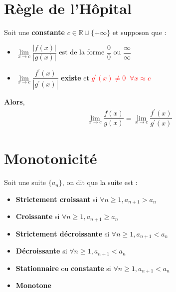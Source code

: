 \documentclass{report}
\begin{document}
\begin{multicols*}{3}
    \section{Règle de l'Hôpital}
        Soit une \textbf{constante} $c \in \mathbb{R} \cup \{+\infty\}$ et supposon que : 
        \begin{itemize}
        \item $\lim\limits_{x\to c}\dfrac{|f(x)|}{|g(x)|}$ 
            est de la forme $\dfrac{0}{0}$ ou 
            $\dfrac{\infty }{\infty }$
        \item $\lim\limits_{x\to c}\dfrac{f^{\prime}(x)}{|g^{\prime}(x)|}$
            \textbf{existe} et 
            \textcolor{red}{$g^{\prime}(x) \neq 0 \;\; \forall x \approx c$ }
        \end{itemize}
        \textbf{Alors}, 
        \begin{align*}
            \lim\limits_{x\to c}\dfrac{f(x)}{g(x)} = 
            \lim\limits_{x\to c}\dfrac{f^{\prime}(x)}{g^{\prime}(x)}
        \end{align*}
        


    \section{Monotonicité} 
        Soit une suite $\{a_n \}$, on dit que la suite est :
        \begin{itemize}
            \item \textbf{Strictement croissant} si $\forall n \geq 1, 
                a_{n+1} > a_n$
            \item \textbf{Croissante} si $\forall n \geq 1, 
                a_{n+1} \geq a_n$ 
            \item \textbf{Strictement décroissante} si $\forall n \geq 1, 
                a_{n+1} < a_n$ 
            \item \textbf{Décroissante} si $\forall n \geq 1, 
                a_{n+1} < a_n$ 
            \item \textbf{Stationnaire} ou \textbf{constante} si 
                $\forall n \geq 1, 
                a_{n+1} < a_n$ 
            \item \textbf{Monotone}  
        \end{itemize} 




\end{multicols*}
\end{document}
